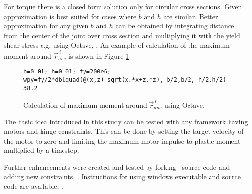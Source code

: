 For torque there is a closed form solution only for
circular cross sections.
Given approximation is 
best suited for cases where $b$ and $h$ are similar.
Better approximation for any given $b$ and $h$ can be obtained 
by integrating distance from the center of the joint over cross section and
multiplying it with the yield shear stress e.g. using Octave, \cite{octave}.
An example of calculation of the maximum moment  around $\vec{r}_{anc}^{\,i} $
is shown in Figure \ref{fig:octave-mp}

\begin{figure}[htb!]
\centering
\lstset{language=octave}
\begin{lstlisting}
b=0.01; h=0.01; fy=200e6;
wpy=fy/2*dblquad(@(x,z) sqrt(x.*x+z.*z),-b/2,b/2,-h/2,h/2)
38.2
\end{lstlisting}

\caption{Calculation of maximum moment  around $\vec{r}_{anc}^{\,i} $ using Octave.}
\label{fig:octave-mp}
\end{figure}


The basic idea introduced in this study can be tested with any framework having motors and hinge constraints.
This can be done by setting the target velocity of the motor to zero and limiting 
the maximum motor impulse to plastic moment multiplied by a timestep.

Further enhancements were created and tested by forking \bullet\ source code
and adding new constraints, \cite{pbullet}.
Instructions for using  windows executable and  source code are available, \cite{bp}.

